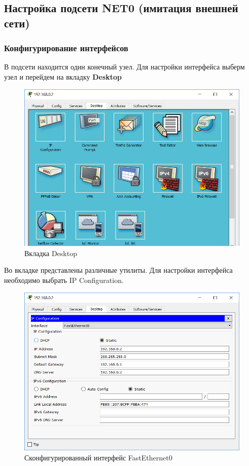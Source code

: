 \documentclass[14pt,a4paper,report]{report}
\begin{document}
\subsection{Настройка подсети NET0 (имитация внешней сети)}
\subsubsection{Конфигурирование интерфейсов}
В подсети находится один конечный узел. Для настройки интерфейса выберм узел и перейдем на вкладку \textbf{Desktop}
\begin{figure}[h]
  \centering
  \includegraphics[width=.62\textwidth]{img/net0_0_2__0}
  \caption{Вкладка Desktop}
\end{figure}

Во вкладке представлены различные утилиты. Для настройки интерфейса необходимо выбрать IP Configuration.

\begin{figure}[h]
  \centering
  \includegraphics[width=.9\textwidth]{img/net0_0_2__1}
  \caption{Сконфигурированный интерфейс FastEthernet0}
\end{figure}
\end{document}
